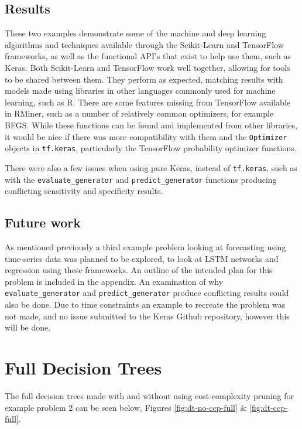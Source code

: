 \documentclass[12pt,a4paper,titlepage,twoside]{report}
\begin{document}
\section{Results}
	These two examples demonstrate some of the machine and deep learning algorithms and techniques available through the Scikit-Learn and TensorFlow frameworks, as well as the functional API's that exist to help use them, such as Keras. Both Scikit-Learn and TensorFlow work well together, allowing for tools to be shared between them. They perform as expected, matching results with models made using libraries in other languages commonly used for machine learning, such as R. There are some features missing from TensorFlow available in RMiner, such as a number of relatively common optimizers, for example BFGS. While these functions can be found and implemented from other libraries, it would be nice if there was more compatibility with them and the \texttt{Optimizer} objects in \texttt{tf.keras}, particularly the TensorFlow probability optimizer functions. \par
	There were also a few issues when using pure Keras, instead of \texttt{tf.keras}, such as with the \texttt{evaluate_generator} and \texttt{predict_generator} functions producing conflicting sensitivity and specificity results. 
	
\section{Future work}
	As mentioned previously a third example problem looking at forecasting using time-series data was planned to be explored, to look at LSTM networks and regression using these frameworks. An outline of the intended plan for this problem is included in the appendix. An examination of why \texttt{evaluate_generator} and \texttt{predict_generator} produce conflicting results could also be done. Due to time constraints an example to recreate the problem was not made, and no issue submitted to the Keras Github repository, however this will be done.

\appendix
{}

\chapter{Full Decision Trees}

	The full decision trees made with and without using cost-complexity pruning for example problem 2 can be seen below, Figures \ref{fig:dt-no-ccp-full} \& \ref{fig:dt-ccp-full}.
	
\end{document}
